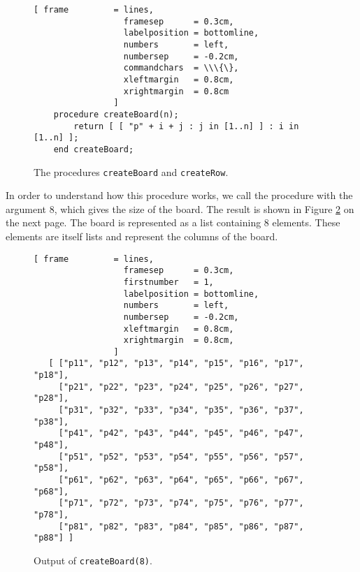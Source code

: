 \begin{figure}[!ht]
  \centering
\begin{Verbatim}[ frame         = lines, 
                  framesep      = 0.3cm, 
                  labelposition = bottomline,
                  numbers       = left,
                  numbersep     = -0.2cm,
                  commandchars  = \\\{\},
                  xleftmargin   = 0.8cm,
                  xrightmargin  = 0.8cm
                ]
    procedure createBoard(n);
        return [ [ "p" + i + j : j in [1..n] ] : i in [1..n] ];
    end createBoard;
\end{Verbatim}
\vspace*{-0.3cm}
  \caption{The procedures \texttt{createBoard} and \texttt{createRow}.}
  \label{fig:createBoard}
\end{figure}

In order to understand how this procedure works, we call the procedure with the argument 8,
which gives the size of the board.  The result is shown in Figure
\ref{fig:createBoard-output} on the next page.
The board is represented as a list containing 8 elements.  These elements are itself lists
and represent the columns of the board.

\begin{figure}[!ht]
\centering
\begin{Verbatim}[ frame         = lines, 
                  framesep      = 0.3cm, 
                  firstnumber   = 1,
                  labelposition = bottomline,
                  numbers       = left,
                  numbersep     = -0.2cm,
                  xleftmargin   = 0.8cm,
                  xrightmargin  = 0.8cm,
                ]
   [ ["p11", "p12", "p13", "p14", "p15", "p16", "p17", "p18"], 
     ["p21", "p22", "p23", "p24", "p25", "p26", "p27", "p28"], 
     ["p31", "p32", "p33", "p34", "p35", "p36", "p37", "p38"], 
     ["p41", "p42", "p43", "p44", "p45", "p46", "p47", "p48"], 
     ["p51", "p52", "p53", "p54", "p55", "p56", "p57", "p58"], 
     ["p61", "p62", "p63", "p64", "p65", "p66", "p67", "p68"], 
     ["p71", "p72", "p73", "p74", "p75", "p76", "p77", "p78"], 
     ["p81", "p82", "p83", "p84", "p85", "p86", "p87", "p88"] ]
\end{Verbatim}
\vspace*{-0.3cm}
\caption{Output of \texttt{createBoard(8)}.}
\label{fig:createBoard-output}
\end{figure}

